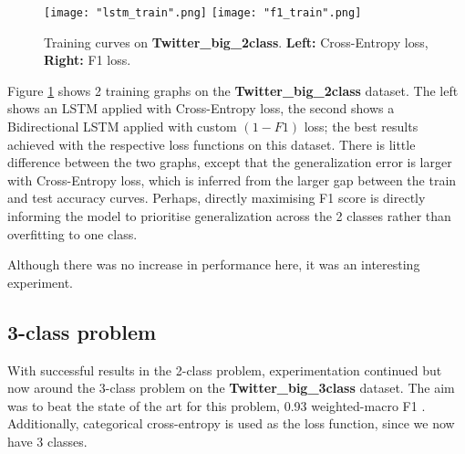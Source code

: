 \documentclass[12pt,a4paper]{article}
\begin{document}
\begin{figure}[H]
	\centering
	\texttt{[image: "lstm\_train".png]} \hfill
	\texttt{[image: "f1\_train".png]}\hfill
	
	\caption{Training curves on \textbf{Twitter\_big\_2class}. \textbf{Left:} Cross-Entropy loss, \textbf{Right:} F1 loss.}
	\label{train:train2}
\end{figure}

Figure \ref{train:train2} shows 2 training graphs on the \textbf{Twitter\_big\_2class} dataset. The left shows an LSTM applied with Cross-Entropy loss, the second shows a Bidirectional LSTM applied with custom $(1-F1)$ loss; the best results achieved with the respective loss functions on this dataset. There is little difference between the two graphs, except that the generalization error is larger with Cross-Entropy loss, which is inferred from the larger gap between the train and test accuracy curves. Perhaps, directly maximising F1 score is directly informing the model to prioritise generalization across the 2 classes rather than overfitting to one class.

Although there was no increase in performance here, it was an interesting experiment.

\subsection{3-class problem}

With successful results in the 2-class problem, experimentation continued but now around the 3-class problem on the \textbf{Twitter\_big\_3class} dataset. The aim was to beat the state of the art for this problem, 0.93 weighted-macro F1 \cite{Badjatiya}. Additionally, categorical cross-entropy is used as the loss function, since we now have 3 classes.
\end{document}
